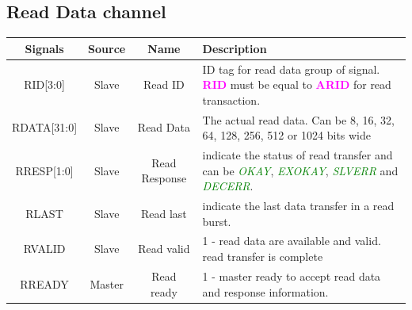 \documentclass{article}
\newcommand{\AXISignals}[1]{\textbf{\textcolor{magenta}{#1}}}
\begin{document}
\subsection{Read Data channel}
\begin{table}[H]
    \begin{center}
        \begin{tabular}{c|c|c|p{9.5cm}}
            \textbf{Signals} & \textbf{Source} & \textbf{Name} & \textbf{Description}                                                                                                                                                                      \\
            \hline
            RID[3:0]         & Slave           & Read ID       & ID tag for read data group of signal. \AXISignals{RID} must be equal to \AXISignals{ARID} for read transaction.                                                                           \\
            RDATA[31:0]      & Slave           & Read Data     & The actual read data. Can be 8, 16, 32, 64, 128, 256, 512 or 1024 bits wide                                                                                                               \\
            RRESP[1:0]       & Slave           & Read Response & indicate the status of read transfer and can be  \emph{\textcolor{green}{OKAY}}, \emph{\textcolor{green}{EXOKAY}}, \emph{\textcolor{green}{SLVERR}} and \emph{\textcolor{green}{DECERR}}. \\
            RLAST            & Slave           & Read last     & indicate the last data transfer in a read burst.                                                                                                                                          \\
            RVALID           & Slave           & Read valid    & 1 - read data are available and valid.  read transfer is complete                                                                                                                         \\
            RREADY           & Master          & Read ready    & 1 - master ready to accept read data and response information.                                                                                                                            \\
        \end{tabular}
    \end{center}
\end{table}
\end{document}
